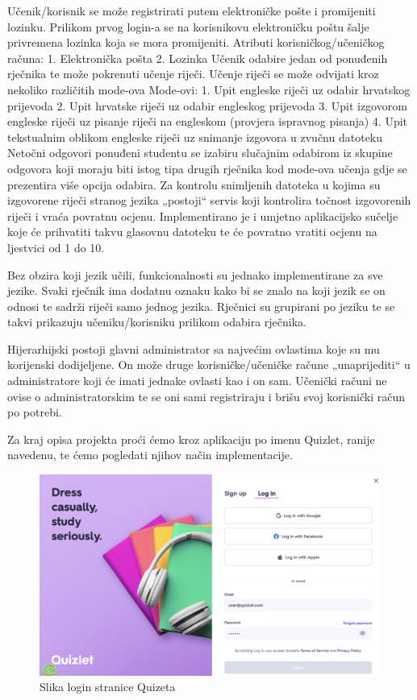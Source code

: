 Učenik/korisnik se može registrirati putem elektroničke pošte i promijeniti lozinku. Prilikom prvog login-a se na korisnikovu elektroničku poštu šalje privremena lozinka koja se mora promijeniti. 
Atributi korisničkog/učeničkog računa: 
1.	Elektronička pošta 
2.	Lozinka 
Učenik odabire jedan od ponuđenih rječnika te može pokrenuti učenje riječi. 
Učenje riječi se može odvijati kroz nekoliko različitih mode-ova
Mode-ovi:
1.	Upit engleske riječi uz odabir hrvatskog prijevoda 
2.	Upit hrvatske riječi uz odabir engleskog prijevoda
3.	Upit izgovorom engleske riječi uz pisanje riječi na engleskom (provjera ispravnog pisanja)
4.	Upit tekstualnim oblikom engleske riječi uz snimanje izgovora u zvučnu datoteku
Netočni odgovori ponuđeni studentu se izabiru slučajnim odabirom iz skupine odgovora koji moraju biti istog tipa drugih rječnika kod mode-ova učenja gdje se prezentira više opcija odabira. Za kontrolu snimljenih datoteka u kojima su izgovorene riječi stranog jezika „postoji“ servis koji kontrolira točnost izgovorenih riječi i vraća povratnu ocjenu. Implementirano je i umjetno aplikacijsko sučelje koje će prihvatiti takvu glasovnu datoteku te će povratno vratiti ocjenu na ljestvici od 1 do 10. 

Bez obzira koji jezik učili, funkcionalnosti su jednako implementirane za sve jezike. Svaki rječnik ima dodatnu oznaku kako bi se znalo na koji jezik se on odnosi te sadrži riječi samo jednog jezika. Rječnici su grupirani po jeziku te se takvi prikazuju učeniku/korisniku prilikom odabira rječnika. 

Hijerarhijski postoji glavni administrator sa najvećim ovlastima koje su mu korijenski dodijeljene. On može druge korisničke/učeničke račune „unaprijediti“ u administratore koji će imati jednake ovlasti kao i on sam. Učenički računi ne ovise o administratorskim te se oni sami registriraju i brišu svoj korisnički račun po potrebi.

Za kraj opisa projekta proći ćemo kroz aplikaciju po imenu Quizlet, ranije navedenu, te ćemo pogledati njihov način implementacije.

\begin{figure}[H]
	\includegraphics[width=\textwidth]{SlikeOpisProjekta/login_screen_quizlet.png} %
	\caption{Slika login stranice Quizeta}
	\label{fig:LoginScreenQuizlet} %
\end{figure}

